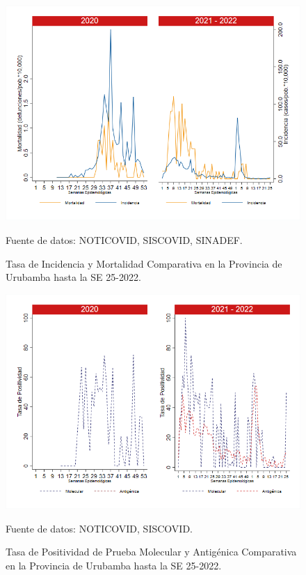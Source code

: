 \documentclass[12pt,a4paper,openany]{book}
\begin{document}
	\begin{figure}[h]
		\caption{Tasa de Incidencia y Mortalidad Comparativa en la Provincia de Urubamba hasta la SE 25-2022.}\label{fig:inc_urub}
		\begin{center}
			\includegraphics[width=0.85\linewidth]{../figuras/incidencia_mortalidad_20_21_13.png}
		\end{center}
		{\footnotesize {Fuente de datos: NOTICOVID, SISCOVID, SINADEF.}}
	\end{figure}
	
	\begin{figure}[h]
		\caption{Tasa de Positividad de Prueba Molecular y Antigénica Comparativa en la Provincia de Urubamba hasta la SE 25-2022.}\label{fig:positividad_urub}
		\begin{center}
			\includegraphics[width=0.7\linewidth]{../figuras/positividad_20_21_13.png}
		\end{center}
		{\footnotesize {Fuente de datos: NOTICOVID, SISCOVID.}}
	\end{figure}
	
\end{document}
